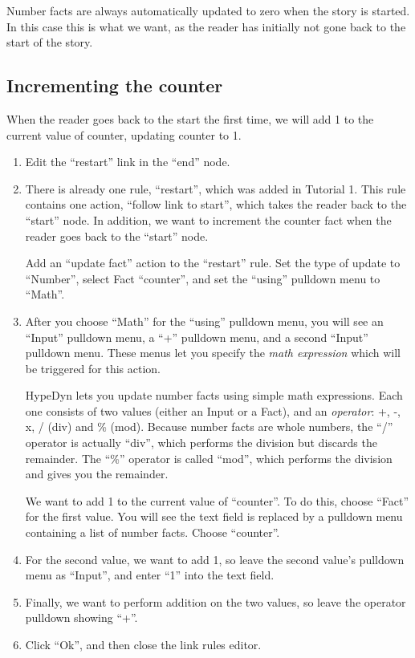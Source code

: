 \documentclass{article}
\begin{document}
\noindent Number facts are always 
automatically updated to zero when the story is started. In this case 
this is what we want, as the reader has initially not gone back to 
the start of the story.

\subsection{Incrementing the counter}

 When the reader goes back to the start the 
first time, we will add 1 to the current value of counter, updating 
counter to 1.

\begin{enumerate}
    \item Edit the ``restart'' link in the ``end'' node. 
    \item There is already one rule, ``restart'', which was added in 
    Tutorial 1. This rule contains one action, ``follow link to 
    start'', which takes the reader back to the ``start'' node. In 
    addition, we want to increment the counter fact when the reader 
    goes back to the ``start'' node.
    
    Add an ``update fact'' action to the ``restart'' rule. Set the 
    type of update to ``Number'', select Fact ``counter'', and set 
    the ``using'' pulldown menu to ``Math''.
    \item After you choose ``Math'' for the ``using'' pulldown menu, 
    you will see an ``Input'' pulldown menu, a ``+'' pulldown menu, 
    and a second ``Input'' pulldown menu. These menus let you specify 
    the \textit{math expression} which will be triggered for this 
    action. 
    
    HypeDyn lets you update number facts using simple math 
    expressions. Each one consists of two values (either an Input or 
    a Fact), and an \textit{operator}: +, -, x, / (div) and \% (mod). 
    Because number facts are whole numbers, the ``/'' operator is 
    actually ``div'', which performs the division but discards the 
    remainder. The ``\%'' operator is called ``mod'', which performs 
    the division and gives you the remainder.
    
    We want to add 1 to the current value of ``counter''. To do this, 
    choose ``Fact'' for the first value. You will see the text field 
    is replaced by a pulldown menu containing a list of number facts. 
    Choose ``counter''.
    \item For the second value, we want to add 1, so leave the second 
    value's pulldown menu as ``Input'', and enter ``1'' into the text 
    field. 
    \item Finally, we want to perform addition on the two values, so 
    leave the operator pulldown showing ``+''.
    \item Click ``Ok'', and then close the link rules editor.
\end{enumerate}
\end{document}

